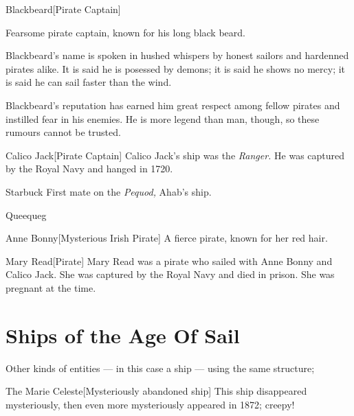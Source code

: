 \begin{rpgentity}{Blackbeard}[Pirate Captain]

    Fearsome pirate captain, known for his long black beard.

    Blackbeard's name is spoken in hushed whispers by honest sailors and hardenned pirates alike. It is said he is posessed by demons; it is said he shows no mercy; it is said he can sail faster than the wind.

    Blackbeard's reputation has earned him great respect among fellow pirates and instilled fear in his enemies. He is more legend than man, though, so these rumours cannot be trusted.

\end{rpgentity}

\begin{rpgentity}{Calico Jack}[Pirate Captain]
    Calico Jack's ship was the \emph{Ranger.} He was captured by the Royal Navy and hanged in 1720.
\end{rpgentity}

\begin{rpgentity}{Starbuck}
    First mate on the \emph{Pequod,} Ahab's ship.
\end{rpgentity}

\begin{rpgentity}{Queequeg}
\end{rpgentity}

\begin{rpgentity}{Anne Bonny}[Mysterious Irish Pirate]
    A fierce pirate, known for her red hair. \lipsum[][54-58]
\end{rpgentity}

\begin{rpgentity}{Mary Read}[Pirate]
    Mary Read was a pirate who sailed with Anne Bonny and Calico Jack. She was captured by the Royal Navy and died in prison. She was pregnant at the time.
\end{rpgentity}

\section{Ships of the Age Of Sail}

Other kinds of entities --- in this case a ship --- using the same structure;

\begin{rpgentity}{The Marie Celeste}[Mysteriously abandoned ship]
    This ship disappeared mysteriously, then even more mysteriously appeared in 1872; creepy!
\end{rpgentity}

